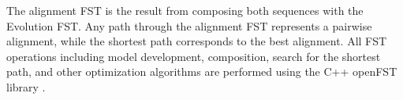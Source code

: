 The alignment FST is the result from composing both sequences with the Evolution
FST.
Any path through the alignment FST represents a pairwise alignment, while the
shortest path corresponds to the best alignment.
All FST operations including model development, composition, search for the
shortest path, and other optimization algorithms are performed using the C++
openFST library \parencite{allauzen2007openfst}.


